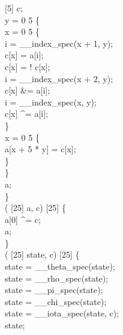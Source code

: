  [5] c;\\
 y = 0  5 \{\\
 x = 0  5 \{\\
i = __index_spec(x + 1, y);\\
c[x] = a[i];\\
c[x] = ! c[x];\\
i = __index_spec(x + 2, y);\\
c[x] &= a[i];\\
i = __index_spec(x, y);\\
c[x] \textasciicircum{}= a[i];\\
\}\\
 x = 0  5 \{\\
a[x + 5 * y] = c[x];\\
\}\\
\}\\
 a;\\
\}\\
  ( [25] a,   c) \jasminarrow{}  [25] \{\\
a[0] \textasciicircum{}= c;\\
 a;\\
\}\\
  ( [25] state,   c) \jasminarrow{}  [25] \{\\
state = __theta_spec(state);\\
state = __rho_spec(state);\\
state = __pi_spec(state);\\
state = __chi_spec(state);\\
state = __iota_spec(state, c);\\
 state;\\
